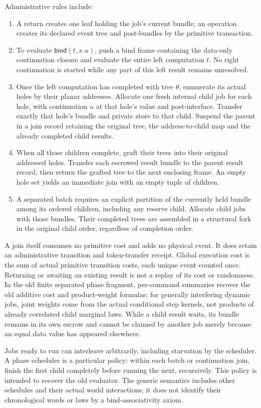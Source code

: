 \documentclass[11pt]{article}
\begin{document}
Administrative rules include:
\begin{enumerate}
\item A return creates one leaf holding the job's current bundle; an operation creates its declared event tree and post-bundles by the primitive transaction.
\item To evaluate $\mathsf{bind}(t,x.u)$, push a bind frame containing the data-only continuation closure and evaluate the entire left computation $t$. No right continuation is started while any part of this left result remains unresolved.
\item Once the left computation has completed with tree $\theta$, enumerate its actual holes by their planar addresses. Allocate one fresh internal child job for each hole, with continuation $u$ at that hole's value and post-interface. Transfer exactly that hole's bundle and private store to that child. Suspend the parent in a join record retaining the original tree, the address-to-child map and the already completed child results.
\item When all those children complete, graft their trees into their original addressed holes. Transfer each escrowed result bundle to the parent result record, then return the grafted tree to the next enclosing frame. An empty hole set yields an immediate join with an empty tuple of children.
\item A separated batch requires an explicit partition of the currently held bundle among its ordered children, including any reserve child. Allocate child jobs with those bundles. Their completed trees are assembled in a structural fork in the original child order, regardless of completion order.
\end{enumerate}
A join itself consumes no primitive cost and adds no physical event. It does retain an administrative transition and token-transfer receipt. Global execution cost is the sum of actual primitive transition costs, each unique event counted once. Returning or awaiting an existing result is not a replay of its cost or randomness. In the old finite separated phase fragment, per-command summaries recover the old additive cost and product-weight formulas; for generally interfering dynamic jobs, joint weights come from the actual conditional step kernels, not products of already correlated child marginal laws. While a child result waits, its bundle remains in its own escrow and cannot be claimed by another job merely because an equal data value has appeared elsewhere.

Jobs ready to run can interleave arbitrarily, including starvation by the scheduler. A phase scheduler is a particular policy: within each batch or continuation join, finish the first child completely before running the next, recursively. This policy is intended to recover the old evaluator. The generic semantics includes other schedules and their actual world interactions; it does not identify their chronological words or laws by a bind-associativity axiom.
\end{document}

